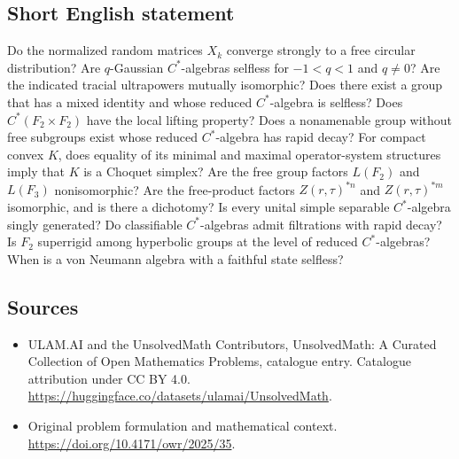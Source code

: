 \documentclass[11pt]{article}
\begin{document}
\subsection{Short English statement}
Do the normalized random matrices $X_k$ converge strongly to a free circular distribution? Are $q$-Gaussian $C^*$-algebras selfless for $-1<q<1$ and $q\neq0$? Are the indicated tracial ultrapowers mutually isomorphic? Does there exist a group that has a mixed identity and whose reduced $C^*$-algebra is selfless? Does $C^*(F_2\times F_2)$ have the local lifting property? Does a nonamenable group without free subgroups exist whose reduced $C^*$-algebra has rapid decay? For compact convex $K$, does equality of its minimal and maximal operator-system structures imply that $K$ is a Choquet simplex? Are the free group factors $L(F_2)$ and $L(F_3)$ nonisomorphic? Are the free-product factors $Z(r,\tau)^{*n}$ and $Z(r,\tau)^{*m}$ isomorphic, and is there a dichotomy? Is every unital simple separable $C^*$-algebra singly generated? Do classifiable $C^*$-algebras admit filtrations with rapid decay? Is $F_2$ superrigid among hyperbolic groups at the level of reduced $C^*$-algebras? When is a von Neumann algebra with a faithful state selfless?
\subsection{Sources}
\begin{itemize}
\item[\hypertarget{source:statement:1}{S1}] ULAM.AI and the UnsolvedMath Contributors, UnsolvedMath: A Curated Collection of Open Mathematics Problems, catalogue entry. Catalogue attribution under CC BY 4.0.
\url{https://huggingface.co/datasets/ulamai/UnsolvedMath}.
\item[\hypertarget{source:statement:2}{S2}] Original problem formulation and mathematical context.
\url{https://doi.org/10.4171/owr/2025/35}.
\end{itemize}
\label{end:statement}
\end{document}
